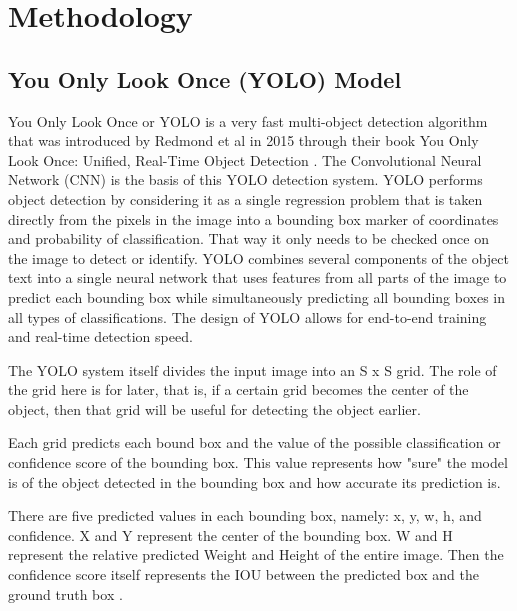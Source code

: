 \section{Methodology}
\label{sec:arsitektur}

\subsection{You Only Look Once (YOLO) Model}
\label{subsec:yolo_base}

\par You Only Look Once or YOLO is a very fast multi-object detection algorithm that was introduced by Redmond et al in 2015 through their book You Only Look Once: Unified, Real-Time Object Detection \cite{redmon2016you}. The Convolutional Neural Network (CNN) is the basis of this YOLO detection system. YOLO performs object detection by considering it as a single regression problem that is taken directly from the pixels in the image into a bounding box marker of coordinates and probability of classification. That way it only needs to be checked once on the image to detect or identify. \cite{redmon2016you} YOLO combines several components of the object text into a single neural network that uses features from all parts of the image to predict each bounding box while simultaneously predicting all bounding boxes in all types of classifications. The design of YOLO allows for end-to-end training and real-time detection speed.

\par The YOLO system itself divides the input image into an S x S grid. The role of the grid here is for later, that is, if a certain grid becomes the center of the object, then that grid will be useful for detecting the object earlier.

\par Each grid predicts each bound box and the value of the possible classification or confidence score of the bounding box. This value represents how "sure" the model is of the object detected in the bounding box and how accurate its prediction is.

\par There are five predicted values in each bounding box, namely: x, y, w, h, and confidence. X and Y represent the center of the bounding box. W and H represent the relative predicted Weight and Height of the entire image. Then the confidence score itself represents the IOU between the predicted box and the ground truth box \cite{redmon2016you}.

